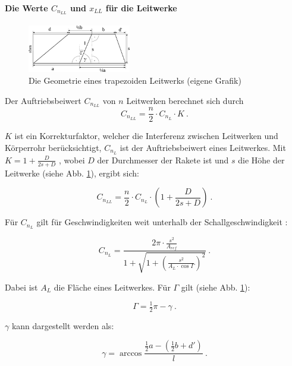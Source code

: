 \documentclass[10pt,a4paper]{article}
\begin{document}
\paragraph{Die Werte $C_{n_{LL}}$ und $x_{LL}$ für die Leitwerke}

\begin{figure}[H]
	\centering
	\includegraphics[width=0.4\textwidth]{Bilder/Leitwerk-Geometrie.pdf}
	\caption{Die Geometrie eines trapezoiden Leitwerks (eigene Grafik)}
	\label{Leitwerk-Geometrie-Abb}
\end{figure}

Der Auftriebsbeiwert $C_{n_{LL}}$ von $n$ Leitwerken berechnet sich durch \cite{sn}
\[ C_{n_{LL}} = \frac{n}{2} \cdot C_{n_{L}} \cdot K \ .\]

\noindent
$K$ ist ein Korrekturfaktor, welcher die Interferenz zwischen Leitwerken und Körperrohr berücksichtigt, $C_{n_{L}}$ ist der Auftriebsbeiwert eines Leitwerkes.
Mit $K=1+\frac{D}{2s + D}$ \cite{AbR,sn}, wobei $D$ der Durchmesser der Rakete ist und $s$ die Höhe der Leitwerke (siehe Abb. \ref{Leitwerk-Geometrie-Abb}), ergibt sich:

\begin{equation}
C_{n_{LL}} = \frac{n}{2} \cdot C_{n_{L}} \cdot \left(1+\frac{D}{2s + D}\right) \ .
\end{equation}

\noindent
Für $C_{n_{L}}$ gilt für Geschwindigkeiten weit unterhalb der Schallgeschwindigkeit \cite{sn}:

\begin{equation}
C_{n_{L}} = \dfrac{2\pi \cdot \frac{s^{2}}{A_{ref}}} {1+ \sqrt{1+ \left(\frac{s^{2}}{A_{L} \cdot \cos \Gamma}\right) ^{2} }} \ .
\end{equation}

\noindent
Dabei ist ${A_{L}}$ die Fläche eines Leitwerkes. 
Für $\Gamma$ gilt (siehe Abb. \ref{Leitwerk-Geometrie-Abb}):

\begin{equation}
\Gamma = \tfrac{1}{2} \pi - \gamma \ .
\label{equ-Gamma}
\end{equation}

\noindent
$\gamma$ kann dargestellt werden als:

\[ \gamma = \arccos \frac{\tfrac{1}{2}a - \left(\tfrac{1}{2}b + d'\right) }{l} \ .\]
\end{document}

